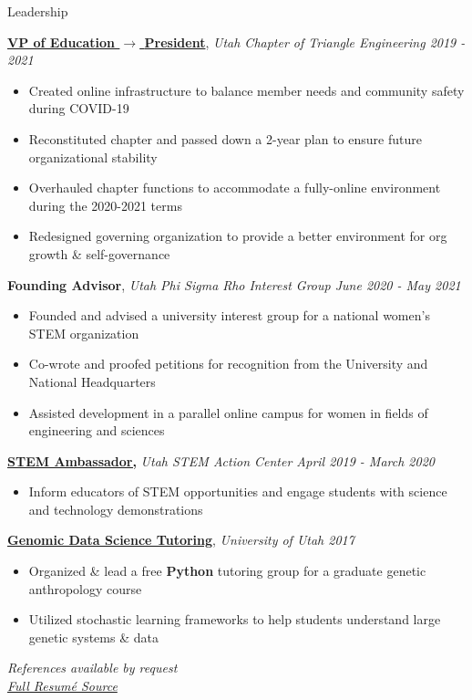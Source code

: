 \documentclass{resume/resume}
\begin{document}

\begin{rSection}{Leadership}
 
    \href{https://github.com/UtahTriangle/Laws}{\bf VP of Education $\rightarrow$ \bf President}, {\em Utah Chapter of Triangle Engineering \hfill 2019 - 2021}
    \vspace{-6pt}
    \begin{itemize}[nosep]
        \item Created online infrastructure to balance member needs and community safety during COVID-19
        \item Reconstituted chapter and passed down a 2-year plan to ensure future organizational stability
        \item Overhauled chapter functions to accommodate a fully-online environment during the 2020-2021 terms
        \item Redesigned governing organization to provide a better environment for org growth \& self-governance
    \end{itemize}

    {\bf Founding Advisor}, {\em Utah Phi Sigma Rho Interest Group \hfill June 2020 - May 2021}
    \vspace{-6pt}
    \begin{itemize}[nosep]
        \item Founded and advised a university interest group for a national women's STEM organization
        \item Co-wrote and proofed petitions for recognition from the University and National Headquarters
        \item Assisted development in a parallel online campus for women in fields of engineering and sciences
    \end{itemize}
    
    \href{https://stem.utah.gov/students/utah-stem-ambassador-program/}{\bf STEM Ambassador,} {\em Utah STEM Action Center \hfill April 2019 - March 2020}
    \vspace{-6pt}
    \begin{itemize}[nosep]
        \item Inform educators of STEM opportunities and engage students with science and technology demonstrations
    \end{itemize}

    \href{http://content.csbs.utah.edu/~rogers/ant5221/lab/manual.pdf}{\bf Genomic Data Science Tutoring}, {\em University of Utah \hfill 2017}
    \vspace{-6pt}
    \begin{itemize}[nosep]
      \item Organized \& lead a free {\bf Python} tutoring group for a graduate genetic anthropology course
      \item Utilized stochastic learning frameworks to help students understand large genetic systems \& data
    \end{itemize}

\end{rSection}

\vspace{1.2em}
\begin{center}
    {\em References available by request} \\
    {\em \href{https://www.overleaf.com/read/dpkcngtfrygt}{Full Resumé Source}}
\end{center}
\end{document}
